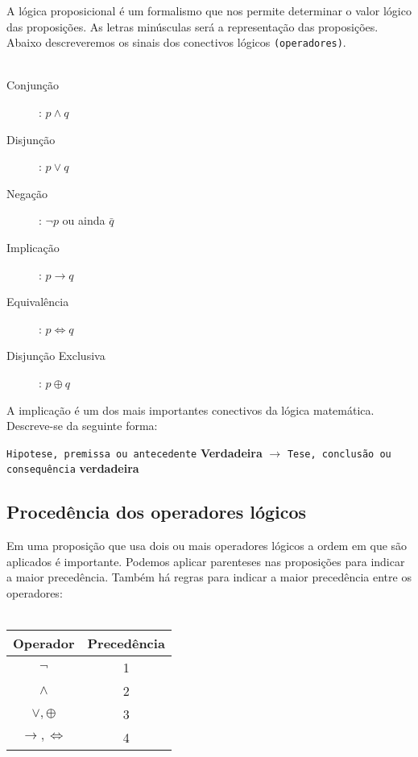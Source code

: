 \documentclass[12pt, onecolumn]{article}
\begin{document}
	A lógica proposicional é um formalismo que nos permite determinar o valor 
	lógico das proposições. As letras minúsculas será a representação das 
	proposições. Abaixo descreveremos os sinais dos conectivos lógicos 
	\texttt{(operadores)}.\\
	\\
		\begin{description}
			\item[Conjunção]: $p \land q$
			\item[Disjunção]: $p \lor q$
			\item[Negação]: $\lnot p$ ou ainda $\bar{q}$
			\item[Implicação]: $p \longrightarrow q$
			\item[Equivalência]: $p \Longleftrightarrow q$
			\item[Disjunção Exclusiva]: $p \oplus q$
		\end{description}

	A implicação é um dos mais importantes conectivos da lógica matemática. 
	Descreve-se da seguinte forma: 

		\begin{center}
			\texttt{Hipotese, premissa ou antecedente} 
			\textbf{Verdadeira} 
			$\longrightarrow$
			\texttt{Tese, conclusão ou consequência} 
			\textbf{verdadeira}
		\end{center}

		\subsection{Procedência dos operadores lógicos}

	Em uma proposição que usa dois ou mais operadores lógicos a ordem em que são
	aplicados é importante. Podemos aplicar parenteses nas proposições para indicar
	a maior precedência. Também há regras para indicar a maior precedência entre
	os operadores: \\
	\\
		\begin{table}[h]
		\centering
			\begin{tabular}{|c|c|}
				\hline
				Operador & Precedência\\ \hline

				$\lnot$ & 1 \\
				$\land$ & 2 \\
				$\lor, \oplus$ & 3 \\
				$\longrightarrow, \Longleftrightarrow$ & 4 \\
				\hline
			\end{tabular}
		\end{table}
	
\end{document}
